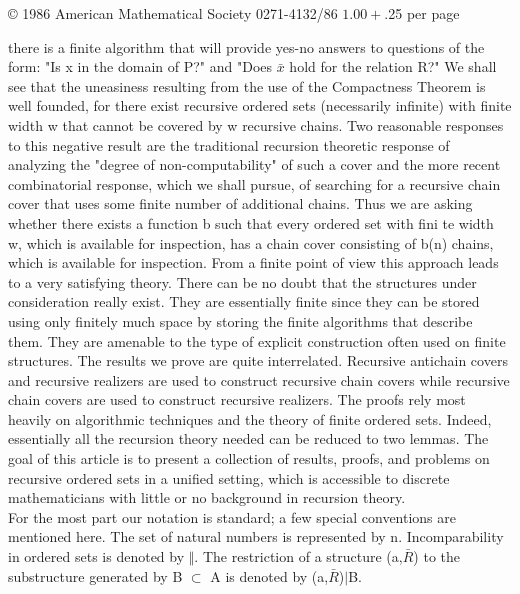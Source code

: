 \documentclass[twoside]{article}
\begin{document}
\begin{flushright}
© 1986 American Mathematical Society 0271-4132/86 $1.00 + $.25 per page
\end{flushright}

\newpage

there is a finite algorithm that will provide yes-no answers to questions of the form:  "Is    x    in the domain of    P?" and "Does $\bar{x}$    hold for the relation R?"  We shall see that the uneasiness resulting from the use of the Compactness Theorem is well founded,  for there exist recursive ordered sets (necessarily infinite) with finite width   w   that   cannot be covered by w recursive chains.    
Two reasonable responses to this negative result are the traditional recursion theoretic response of analyzing the "degree of non-computability" of such a cover and the more recent combinatorial response, which we shall pursue, of searching for a recursive chain cover that uses some finite number of additional chains. 
Thus we are asking whether there exists a function b such that every ordered set with fini te width w, which is available for inspection, has a chain cover consisting of b(n) chains, which is available for inspection. 
From a finite point of view this approach leads to a very satisfying theory. 
There can be no doubt that the structures under consideration really exist. 
They are essentially finite since they can be stored using only finitely much space by storing the finite algorithms that describe them.    
They are amenable to the type of explicit construction often used on finite structures.    
The results we prove are quite interrelated. Recursive antichain covers and recursive realizers are used to construct recursive chain covers while recursive chain covers are used to construct recursive realizers.
The proofs rely most heavily on algorithmic techniques and the theory of finite ordered sets.    
Indeed, essentially all the recursion theory needed can be reduced to two lemmas. 
The goal of this article is to present a collection of results, proofs, and problems on recursive ordered sets in a unified setting, which is accessible to discrete mathematicians with little or no background in recursion theory.\\
\newline
For the most part our notation is standard; a few special conventions are mentioned here. The set of natural numbers is represented by n. 
Incomparability in ordered sets is denoted by $\Vert$. The restriction of a structure (a,$\bar{R}$) to the substructure generated by B $\subset$ A is denoted by (a,$\bar{R}$)$\vert$B.\\
\end{document}
